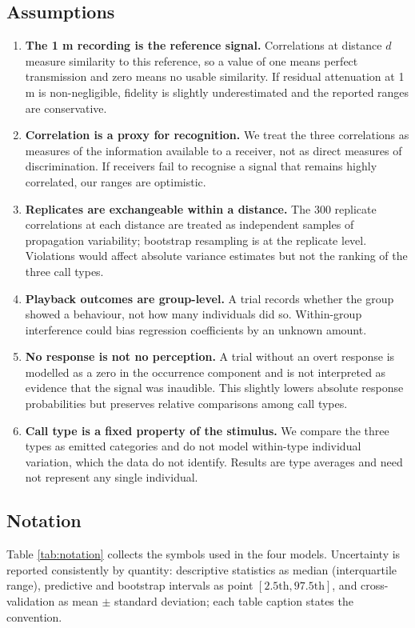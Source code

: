 \documentclass{apmcmthesis}
\begin{document}
\subsection{Assumptions}

\begin{enumerate}
\item \textbf{The 1 m recording is the reference signal.} Correlations at distance $d$ measure similarity to this reference, so a value of one means perfect transmission and zero means no usable similarity. If residual attenuation at 1 m is non-negligible, fidelity is slightly underestimated and the reported ranges are conservative.
\item \textbf{Correlation is a proxy for recognition.} We treat the three correlations as measures of the information available to a receiver, not as direct measures of discrimination. If receivers fail to recognise a signal that remains highly correlated, our ranges are optimistic.
\item \textbf{Replicates are exchangeable within a distance.} The 300 replicate correlations at each distance are treated as independent samples of propagation variability; bootstrap resampling is at the replicate level. Violations would affect absolute variance estimates but not the ranking of the three call types.
\item \textbf{Playback outcomes are group-level.} A trial records whether the group showed a behaviour, not how many individuals did so. Within-group interference could bias regression coefficients by an unknown amount.
\item \textbf{No response is not no perception.} A trial without an overt response is modelled as a zero in the occurrence component and is not interpreted as evidence that the signal was inaudible. This slightly lowers absolute response probabilities but preserves relative comparisons among call types.
\item \textbf{Call type is a fixed property of the stimulus.} We compare the three types as emitted categories and do not model within-type individual variation, which the data do not identify. Results are type averages and need not represent any single individual.
\end{enumerate}

\subsection{Notation}

Table \ref{tab:notation} collects the symbols used in the four models. Uncertainty is reported consistently by quantity: descriptive statistics as median (interquartile range), predictive and bootstrap intervals as point $[2.5\mathrm{th},97.5\mathrm{th}]$, and cross-validation as mean $\pm$ standard deviation; each table caption states the convention.
\end{document}
